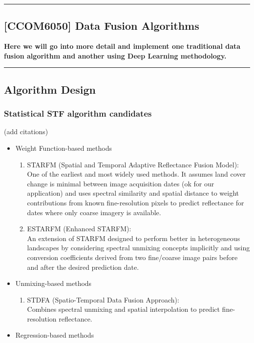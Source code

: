 {\color{gray}\hrule}
\begin{center}
\section{[CCOM6050] Data Fusion Algorithms}
\textbf{Here we will go into more detail and implement one traditional data fusion algorithm and another using Deep Learning methodology.}
\bigskip
\end{center}
{\color{gray}\hrule}

\begin{multicols}{2}

\subsection{Algorithm Design}

\subsubsection{Statistical STF algorithm candidates}
(add citations)

\begin{itemize}
    \item Weight Function-based methods
        \begin{enumerate}
            \item STARFM (Spatial and Temporal Adaptive Reflectance Fusion Model): \\
            One of the earliest and most widely used methods. It assumes land cover change is minimal between image acquisition dates  
            (ok for our application) and uses spectral similarity and spatial distance to weight contributions from known fine-resolution 
            pixels to predict reflectance for dates where only coarse imagery is available. 
            \item ESTARFM (Enhanced STARFM): \\
            An extension of STARFM designed to perform better in heterogeneous landscapes by considering spectral unmixing concepts implicitly 
            and using conversion coefficients derived from two fine/coarse image pairs before and after the desired prediction date. 
        \end{enumerate}
    \item Unmixing-based methods
        \begin{enumerate}
            \item STDFA (Spatio-Temporal Data Fusion Approach): \\
            Combines spectral unmixing and spatial interpolation to predict fine-resolution reflectance. 
        \end{enumerate}
    \item Regression-based methods
\end{itemize}


\end{multicols}
